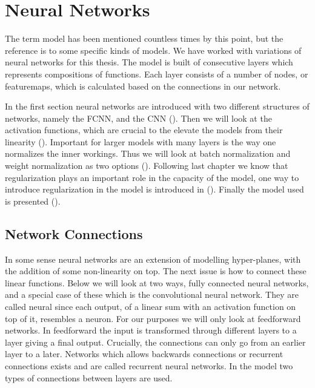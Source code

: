 \chapter{Neural Networks}
\label{chap:nn}
The term model has been mentioned countless times by this point, but the reference is to some specific kinds of models.
We have worked with variations of neural networks for this thesis.
The model is built of consecutive layers which represents compositions of functions.
Each layer consists of a number of nodes, or featuremaps, which is calculated based on the connections in our network.

In the first section neural networks are introduced with two different structures of networks, namely the \ac{FCNN}, and the \ac{CNN} ().
Then we will look at the activation functions, which are crucial to the elevate the models from their linearity ().
Important for larger models with many layers is the way one normalizes the inner workings. Thus we will look at batch normalization and weight normalization as two options ().
Following last chapter we know that regularization plays an important role in the capacity of the model, one way to introduce regularization in the model is introduced in ().
Finally the model used is presented ().
\section{Network Connections}
\label{sec:connections}
In some sense neural networks are an extension of modelling hyper-planes, with the addition of some non-linearity on top. 
The next issue is how to connect these linear functions. Below we will look at two ways, fully connected neural networks, and a special case of these which is the convolutional neural network.
They are called neural since each output, of a linear sum with an activation function on top of it, resembles a neuron. 
For our purposes we will only look at feedforward networks. 
In feedforward the input is transformed through different layers to a layer giving a final output.
Crucially, the connections can only go from an earlier layer to a later. 
Networks which allows backwards connections or recurrent connections exists and are called recurrent neural networks.
In the model two types of connections between layers are used.
